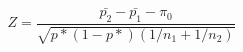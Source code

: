 \documentclass[10pt]{article}
\begin{document}
\[Z=\frac{\bar{p_2}-\bar{p_1}-\pi_0}{\sqrt{p*(1-p*)(1/n_1+1/n_2)}}\]
\end{document}
